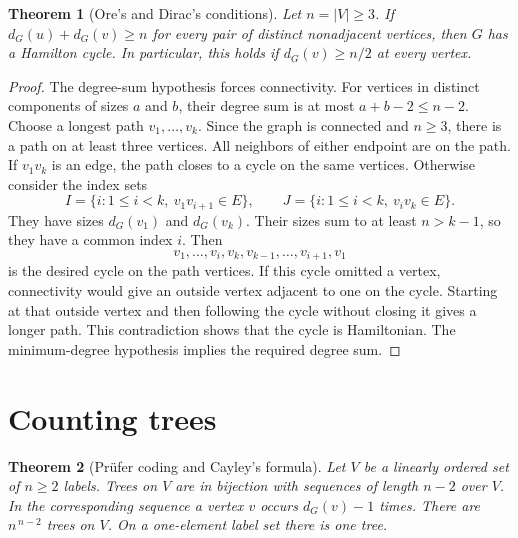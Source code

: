 \documentclass[11pt,oneside,openany]{book}
\theoremstyle{plain}
\newtheorem{theorem}{Theorem}[chapter]
\theoremstyle{definition}
\theoremstyle{remark}
\begin{document}
\begin{theorem}[Ore's and Dirac's conditions]\label{p204:W40}
Let \(n=|V|\geq 3\). If \(d_G(u)+d_G(v)\geq n\) for every pair of
distinct nonadjacent vertices, then \(G\) has a Hamilton cycle.
In particular, this holds if \(d_G(v)\geq n/2\) at every vertex.
\end{theorem}

\begin{proof}
The degree-sum hypothesis forces connectivity. For vertices in distinct
components of sizes \(a\) and \(b\), their degree sum is at most
\(a+b-2\leq n-2\). Choose a longest path \(v_1,\ldots,v_k\).
Since the graph is connected and \(n\geq3\), there is a path on at
least three vertices. All neighbors of either endpoint are on the path.
If \(v_1v_k\) is an edge, the path closes to a cycle on the same vertices.
Otherwise consider the index sets
\[
  I=\{i:1\leq i<k,\ v_1v_{i+1}\in E\},\qquad
  J=\{i:1\leq i<k,\ v_iv_k\in E\}.
\]
They have sizes \(d_G(v_1)\) and \(d_G(v_k)\). Their sizes sum to at least
\(n>k-1\), so they have a common index \(i\). Then
\[
  v_1,\ldots,v_i,v_k,v_{k-1},\ldots,v_{i+1},v_1
\]
is the desired cycle on the path vertices. If this cycle omitted
a vertex, connectivity would give an outside vertex adjacent to
one on the cycle. Starting at that outside vertex and then following
the cycle without closing it gives a longer path. This contradiction
shows that the cycle is Hamiltonian. The minimum-degree hypothesis
implies the required degree sum.
\end{proof}

\section{Counting trees}

\begin{theorem}[Pr\"ufer coding and Cayley's formula]\label{p204:W41}
Let \(V\) be a linearly ordered set of \(n\geq 2\) labels. Trees on \(V\)
are in bijection with sequences of length \(n-2\) over \(V\).
In the corresponding sequence a vertex \(v\) occurs \(d_G(v)-1\) times.
There are \(n^{\,n-2}\) trees on \(V\). On a one-element label set there
is one tree.
\end{theorem}
\end{document}
